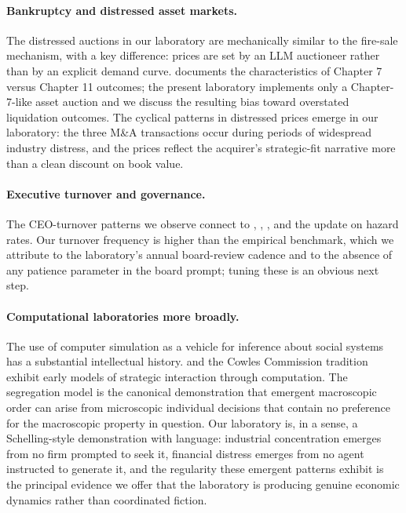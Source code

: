 \documentclass[11pt]{article}
\begin{document}
\paragraph{Bankruptcy and distressed asset markets.} The distressed
auctions in our laboratory are mechanically similar to the
\citet{shleifervishny1992} fire-sale mechanism, with a key
difference: prices are set by an LLM auctioneer rather than by an
explicit demand curve. \citet{strömberg2000} documents the
characteristics of Chapter 7 versus Chapter 11 outcomes; the present
laboratory implements only a Chapter-7-like asset auction and we
discuss the resulting bias toward overstated liquidation outcomes. The
\citet{pulvino1998effects} cyclical patterns in distressed prices
emerge in our laboratory: the three M\&A transactions occur during
periods of widespread industry distress, and the prices reflect the
acquirer's strategic-fit narrative more than a clean discount on book
value.

\paragraph{Executive turnover and governance.} The CEO-turnover patterns
we observe connect to \citet{warner1988stock},
\citet{denis1997ownership}, \citet{taylor2010ceo}, and the
\citet{kaplanminton2012} update on hazard rates. Our turnover frequency
is higher than the empirical benchmark, which we attribute to the
laboratory's annual board-review cadence and to the absence of any
patience parameter in the board prompt; tuning these is an obvious
next step.

\paragraph{Computational laboratories more broadly.} The use of
computer simulation as a vehicle for inference about social systems
has a substantial intellectual history. \citet{shubik1964} and the
Cowles Commission tradition exhibit early models of strategic
interaction through computation. The \citet{schelling1971dynamic}
segregation model is the canonical demonstration that emergent
macroscopic order can arise from microscopic individual decisions
that contain no preference for the macroscopic property in question.
Our laboratory is, in a sense, a Schelling-style demonstration with
language: industrial concentration emerges from no firm prompted to
seek it, financial distress emerges from no agent instructed to
generate it, and the regularity these emergent patterns exhibit is
the principal evidence we offer that the laboratory is producing
genuine economic dynamics rather than coordinated fiction.
\end{document}
